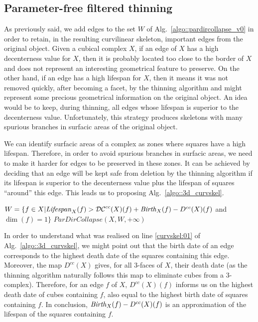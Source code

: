 \documentclass[final,envcountsame]{llncs}
\def\mydist1{D}
\def\mydecent{\mathcal{DC}}
\def\cplDist1#1{\mydist1^{cc}(#1)}
\def\cpldecent#1{\mydecent^{cc}(#1)}
\def\quotes#1{``#1''}
\def\birth#1#2{\mbox{\it{}Birth\/}_{#2}(#1)}
\def\lifespan#1#2{\mbox{\it{}Lifespan\/}_{#2}(#1)}
\def\allfaces#1{\mathbb{F}^{#1}}
\def\subcomplex#1#2{#1 \preceq #2}
\def\complex#1#2{\subcomplex{#2}{\allfaces{#1}}}
\def\mydim#1{\dim(#1)}
\begin{document}
\subsection{Parameter-free filtered thinning}
As previously said, we add edges to the set $W$ of Alg.~\ref{algo::pardircollapse_v0} in order to retain, in the resulting curvilinear skeleton, important edges from the original object. Given a cubical complex $X$, if an edge of $X$ has a high decenterness value for $X$, then it is probably located too close to the border of $X$ and does not represent an interesting geometrical feature to preserve.
On the other hand, if an edge has a high lifespan for $X$, then it means it was not removed quickly, after becoming a facet, by the thinning algorithm and might represent some precious geometrical information on the original object. An idea would be to keep, during thinning, all edges whose lifespan is superior to the decenterness value. Unfortunately, this strategy produces skeletons with many spurious branches in surfacic areas of the original object.

We can identify surfacic areas of a complex as zones where squares have a high lifespan. Therefore, in order to avoid spurious branches in surfacic areas, we need to make it harder for edges to be preserved in these zones. It can be achieved by deciding that an edge will be kept safe from deletion by the thinning algorithm if its lifespan is superior to the decenterness value plus the lifespan of squares \quotes{around} this edge. This leads us to proposing Alg.~\ref{algo::3d_curvskel}. 

\begin{algorithm}[tb]
\label{algo::3d_curvskel}
\caption[CurvilinearSkeleton]{$CurvilinearSkeleton(X)$}
\KwData{A cubical complex $\complex{3}{X}$}
\KwResult{A cubical complex $\complex{3}{Y}$}
 $W=\{f \in X | \lifespan{f}{X} > \cpldecent{X}(f) + \birth{f}{X} - \cplDist1{X}(f)$ and $\mydim{f}=1\}$\;
\Return $ParDirCollapse(X,W,+\infty)$\;
\end{algorithm}

In order to understand what was realised on line \ref{curvskel:01} of Alg.~\ref{algo::3d_curvskel}, we might point out that the birth date of an edge corresponds to the highest death date of the squares containing this edge. Moreover, the map $\cplDist1{X}$ gives, for all 3-faces of $X$, their death date (as the thinning algorithm naturally follows this map to eliminate cubes from a 3-complex). Therefore, for an edge $f$ of $X$, $\cplDist1{X}(f)$ informs us on the highest death date of cubes containing $f$, also equal to the highest birth date of squares containing $f$. In conclusion, $\birth{f}{X} - \cplDist1{X}(f)$ is an approximation of the lifespan of the squares containing $f$.
\end{document}
